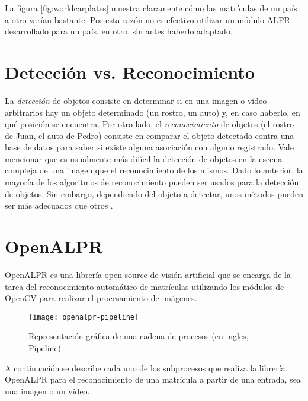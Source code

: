 La figura \ref{fig:worldcarplates} muestra claramente cómo las matrículas de un país a otro varían bastante. Por esta razón no es efectivo utilizar un módulo ALPR desarrollado para un país, en otro, sin antes haberlo adaptado.

\section{Detección vs. Reconocimiento}
La\textit{ detección} de objetos consiste en determinar si en una imagen o vídeo arbitrarios hay un objeto determinado (un rostro, un auto) y, en caso haberlo, en qué posición se encuentra. Por otro lado, el \textit{reconocimiento }de objetos (el rostro de Juan, el auto de Pedro) consiste en comparar el objeto detectado contra una base de datos para saber si existe alguna asociación con alguno registrado. Vale mencionar que es usualmente más difícil la detección de objetos en la escena compleja de una imagen que el reconocimiento de los mismos. Dado lo anterior, la mayoría de los algoritmos de reconocimiento pueden ser usados para la detección de objetos. Sin embargo, dependiendo del objeto a detectar, unos métodos pueden ser más adecuados que otros \cite{Ekvall2005-ut}.

\section{OpenALPR}
OpenALPR es una librería open-source de visión artificial que se encarga de la tarea del reconocimiento automático de matrículas utilizando los módulos de OpenCV para realizar el procesamiento de imágenes.
  
  \begin{figure}[H]
        \centering
        \texttt{[image: openalpr-pipeline]}
        \caption{Representación gráfica de una cadena de procesos (en ingles, Pipeline) \protect\cite{Saini2015-yp}}
        \label{fig:openalpr-pipeline}
\end{figure}
    
A continuación se describe cada uno de los subprocesos que realiza la librería OpenALPR para el reconocimiento de una matrícula a partir de una entrada, sea una imagen o un vídeo. 

